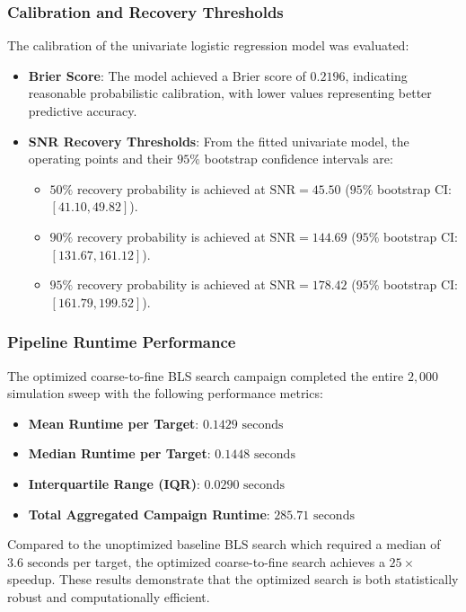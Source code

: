 \subsubsection{Calibration and Recovery Thresholds}
The calibration of the univariate logistic regression model was evaluated:
\begin{itemize}
    \item \textbf{Brier Score}: The model achieved a Brier score of $0.2196$, indicating reasonable probabilistic calibration, with lower values representing better predictive accuracy.
    \item \textbf{SNR Recovery Thresholds}: From the fitted univariate model, the operating points and their $95\%$ bootstrap confidence intervals are:
        \begin{itemize}
            \item $50\%$ recovery probability is achieved at $\text{SNR} = 45.50$ ($95\%$ bootstrap CI: $[41.10, 49.82]$).
            \item $90\%$ recovery probability is achieved at $\text{SNR} = 144.69$ ($95\%$ bootstrap CI: $[131.67, 161.12]$).
            \item $95\%$ recovery probability is achieved at $\text{SNR} = 178.42$ ($95\%$ bootstrap CI: $[161.79, 199.52]$).
        \end{itemize}
\end{itemize}

\subsubsection{Pipeline Runtime Performance}
The optimized coarse-to-fine BLS search campaign completed the entire $2,000$ simulation sweep with the following performance metrics:
\begin{itemize}
    \item \textbf{Mean Runtime per Target}: $0.1429\text{ seconds}$
    \item \textbf{Median Runtime per Target}: $0.1448\text{ seconds}$
    \item \textbf{Interquartile Range (IQR)}: $0.0290\text{ seconds}$
    \item \textbf{Total Aggregated Campaign Runtime}: $285.71\text{ seconds}$
\end{itemize}
Compared to the unoptimized baseline BLS search which required a median of $3.6\text{ seconds}$ per target, the optimized coarse-to-fine search achieves a $25\times$ speedup. These results demonstrate that the optimized search is both statistically robust and computationally efficient.

